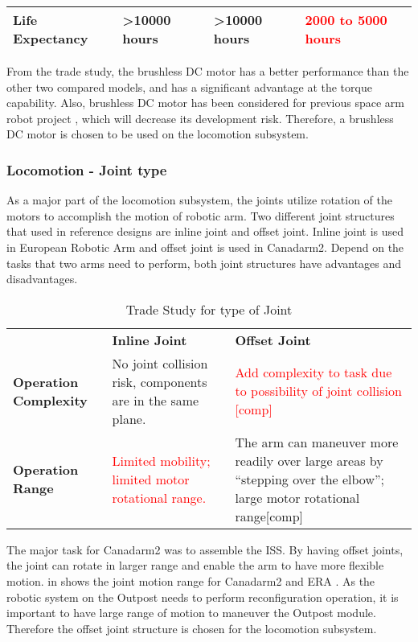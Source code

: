 \begin{table}[H]
\begin{tabular}{|P{2.5cm}|P{4.1cm}|P{4.1cm}|P{4.1cm}|}
\textbf{Life Expectancy}	&
\textcolor{OliveGreen}{\textgreater10000 hours \cite{Pittman_motor}}	&
\textcolor{OliveGreen}{\textgreater10000 hours \cite{Pittman_motor}}   & 
\textcolor{red}{2000 to 5000 hours \cite{Pittman_motor}}	\\\hline
\end{tabular}
\label{table:motorto}
\end{table}
From the trade study, the brushless DC motor has a better performance than the other two compared models, and has a significant advantage at the torque capability. Also, brushless DC motor has been considered for previous space arm robot project \cite{ERA_motor}, which will decrease its development risk. Therefore, a brushless DC motor is chosen to be used on the locomotion subsystem.

\subsubsection{Locomotion - Joint type}
\label{sect:jointto}
As a major part of the locomotion subsystem, the joints utilize rotation of the motors to accomplish the motion of robotic arm. Two different joint structures that used in reference designs are inline joint and offset joint. Inline joint is used in European Robotic Arm and offset joint is used in Canadarm2. Depend on the tasks that two arms need to perform, both joint structures have advantages and disadvantages.
\begin{table}[H]
\caption{Trade Study for type of Joint}
\begin{tabular}{|P{2.5cm}|P{6.35cm}|P{6.35cm}|}
\hline
	&	\textbf{Inline Joint}	&
	\textbf{Offset Joint}	\\\hhline{|=|=|=|}
\textbf{Operation Complexity}	&
\textcolor{OliveGreen}{No joint collision risk, components are in the same plane.}	&
\textcolor{red}{Add complexity to task due to possibility of joint collision [comp]}	\\\hline
\textbf{Operation Range}	&
\textcolor{red}{Limited mobility; limited motor rotational range.}	&
\textcolor{OliveGreen}{The arm can maneuver more readily over large areas by “stepping over the elbow”; large motor rotational range[comp]}	\\\hline
\end{tabular}
\label{table:jointto}
\end{table}

The major task for Canadarm2 was to assemble the ISS. By having offset joints, the joint can rotate in larger range and enable the arm to have more flexible motion.  in  shows the joint motion range for Canadarm2 and ERA \cite{arm_comp}. As the robotic system on the Outpost needs to perform reconfiguration operation, it is important to have large range of motion to maneuver the Outpost module. Therefore the offset joint structure is chosen for the locomotion subsystem.